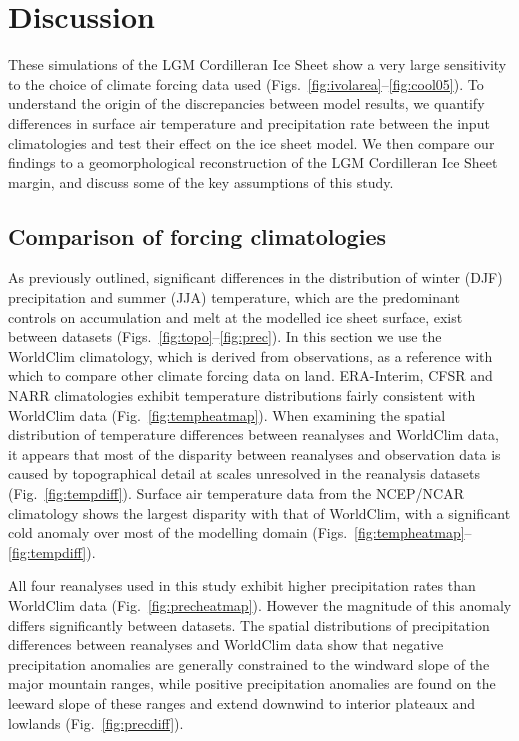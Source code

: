 \section{Discussion}
\label{sec:discussion}

These simulations of the LGM Cordilleran Ice Sheet show a very large sensitivity to the choice of climate forcing data used (Figs.~\ref{fig:ivolarea}--\ref{fig:cool05}). To understand the origin of the discrepancies between model results, we quantify differences in surface air temperature and precipitation rate between the input climatologies and test their effect on the ice sheet model. We then compare our findings to a geomorphological reconstruction of the LGM Cordilleran Ice Sheet margin, and discuss some of the key assumptions of this study.

\subsection{Comparison of forcing climatologies}

As previously outlined, significant differences in the distribution of winter (DJF) precipitation and summer (JJA) temperature, which are the predominant controls on accumulation and melt at the modelled ice sheet surface, exist between datasets (Figs.~\ref{fig:topo}--\ref{fig:prec}). In this section we use the WorldClim climatology, which is derived from observations, as a reference with which to compare other climate forcing data on land. ERA-Interim, CFSR and NARR climatologies exhibit temperature distributions fairly consistent with WorldClim data (Fig.~\ref{fig:tempheatmap}). When examining the spatial distribution of temperature differences between reanalyses and WorldClim data, it appears that most of the disparity between reanalyses and observation data is caused by topographical detail at scales unresolved in the reanalysis datasets (Fig.~\ref{fig:tempdiff}). Surface air temperature data from the NCEP/NCAR climatology shows the largest disparity with that of WorldClim, with a significant cold anomaly over most of the modelling domain (Figs.~\ref{fig:tempheatmap}--\ref{fig:tempdiff}).

All four reanalyses used in this study exhibit higher precipitation rates than WorldClim data (Fig.~\ref{fig:precheatmap}). However the magnitude of this anomaly differs significantly between datasets. The spatial distributions of precipitation differences between reanalyses and WorldClim data show that negative precipitation anomalies are generally constrained to the windward slope of the major mountain ranges, while positive precipitation anomalies are found on the leeward slope of these ranges and extend downwind to interior plateaux and lowlands (Fig.~\ref{fig:precdiff}).

